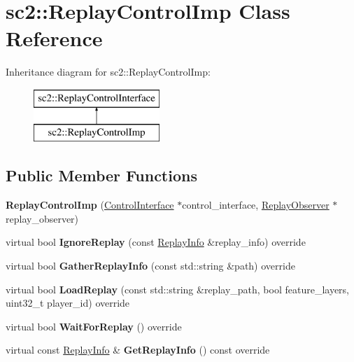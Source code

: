\hypertarget{classsc2_1_1_replay_control_imp}{}\section{sc2\+:\+:Replay\+Control\+Imp Class Reference}
\label{classsc2_1_1_replay_control_imp}
Inheritance diagram for sc2\+:\+:Replay\+Control\+Imp\+:\begin{figure}[H]
\begin{center}
\leavevmode
\includegraphics[height=2.000000cm]{classsc2_1_1_replay_control_imp}
\end{center}
\end{figure}
\subsection*{Public Member Functions}
\begin{DoxyCompactItemize}
\item 
\mbox{\label{classsc2_1_1_replay_control_imp_a23ba76f376aa1df9e9ce88840a775422}} 
{\bfseries Replay\+Control\+Imp} (\hyperlink{classsc2_1_1_control_interface}{Control\+Interface} $\ast$control\+\_\+interface, \hyperlink{classsc2_1_1_replay_observer}{Replay\+Observer} $\ast$replay\+\_\+observer)
\item 
\mbox{\label{classsc2_1_1_replay_control_imp_ac069f28377b2fe1cc2a338076cf74d56}} 
virtual bool {\bfseries Ignore\+Replay} (const \hyperlink{structsc2_1_1_replay_info}{Replay\+Info} \&replay\+\_\+info) override
\item 
\mbox{\label{classsc2_1_1_replay_control_imp_ab31a870a1d568ed8b5227415055c313c}} 
virtual bool {\bfseries Gather\+Replay\+Info} (const std\+::string \&path) override
\item 
\mbox{\label{classsc2_1_1_replay_control_imp_a42315e850062343789e9e8c261ab2f6c}} 
virtual bool {\bfseries Load\+Replay} (const std\+::string \&replay\+\_\+path, bool feature\+\_\+layers, uint32\+\_\+t player\+\_\+id) override
\item 
\mbox{\label{classsc2_1_1_replay_control_imp_a18831f591f759ecd9c26e52f9f46e196}} 
virtual bool {\bfseries Wait\+For\+Replay} () override
\item 
\mbox{\label{classsc2_1_1_replay_control_imp_a2993fd4848c29b7e062246fd69b53d08}} 
virtual const \hyperlink{structsc2_1_1_replay_info}{Replay\+Info} \& {\bfseries Get\+Replay\+Info} () const override
\end{DoxyCompactItemize}
